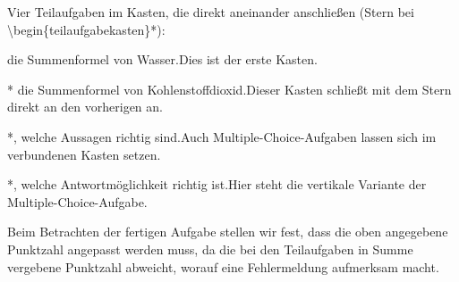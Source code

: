 \documentclass[../main.tex]{subfiles}
\begin{document}
Vier Teilaufgaben im Kasten, die direkt aneinander anschlie\ss{}en (Stern bei \textbackslash begin\{teilaufgabekasten\}*):
\begin{teilaufgabekasten}{ die Summenformel von Wasser.}{Dies ist der erste Kasten.}
\end{teilaufgabekasten}
\begin{teilaufgabekasten}*{ die Summenformel von Kohlenstoffdioxid.}{Dieser Kasten schlie\ss{}t mit dem Stern direkt an den vorherigen an.}
\end{teilaufgabekasten}
\begin{teilaufgabekasten}*{, welche Aussagen richtig sind.}{Auch Multiple-Choice-Aufgaben lassen sich im verbundenen Kasten setzen.}
\end{teilaufgabekasten}
\begin{teilaufgabekasten}*{, welche Antwortm\"oglichkeit richtig ist.}{Hier steht die vertikale Variante der Multiple-Choice-Aufgabe.}
\MCvAnfang
{}
\MCvEnde
\end{teilaufgabekasten}



Beim Betrachten der fertigen Aufgabe stellen wir fest, dass die oben angegebene Punktzahl angepasst werden muss, da die bei den Teilaufgaben in Summe vergebene Punktzahl abweicht, worauf eine Fehlermeldung aufmerksam macht.  

\aufgabenende
\end{document}
